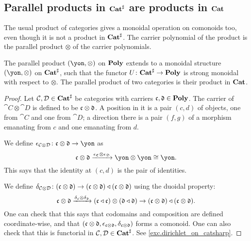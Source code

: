 \documentclass[Book-Poly]{subfiles}
\begin{document}
\subsection{Parallel products in $\mathbf{Cat}^\sharp$ are products in $\mathbf{Cat}$}

The usual product of categories gives a monoidal operation on comonoids too, even though it is not a product in $\mathbf{Cat}^\sharp$. The carrier polynomial of the product is the parallel product $\otimes$ of the carrier polynomials.


\begin{proposition}\label{prop.dirichlet_on_catsharp}
The parallel product $(\yon,\otimes)$ on $\mathbf{Poly}$ extends to a monoidal structure $(\yon,\otimes)$ on $\mathbf{Cat}^\sharp$, such that the functor
$U\colon\mathbf{Cat}^\sharp\to\mathbf{Poly}$
is strong monoidal with respect to $\otimes$.
The parallel product of two categories is their product in $\mathbf{Cat}$.
\end{proposition}
\begin{proof}
Let $\mathcal{C},\mathcal{D}\in\mathbf{Cat}^\sharp$ be categories with carriers $\mathfrak{c},\mathfrak{d}\in\mathbf{Poly}$. The carrier of $\cat{C}\otimes\cat{D}$ is defined to be $\mathfrak{c}\otimes\mathfrak{d}$. A position in it is a pair $(c,d)$ of objects, one from $\cat{C}$ and one from $\cat{D}$; a direction there is a pair $(f,g)$ of a morphism emanating from $c$ and one emanating from $d$. 

We define $\epsilon_{\cat{C}\otimes\cat{D}}\colon\ema{c}\otimes\ema{d}\to\yon$ as
\[
\ema{c}\otimes\ema{d}\To{\epsilon_{\ema{C}}\otimes\epsilon_{\ema{D}}}\yon\otimes\yon\cong\yon.
\]
This says that the identity at $(c,d)$ is the pair of identities.

We define $\delta_{\mathcal{C}\otimes\mathcal{D}}\colon(\mathfrak{c}\otimes\mathfrak{d})\to(\mathfrak{c}\otimes\mathfrak{d})\mathbin{\triangleleft}(\mathfrak{c}\otimes\mathfrak{d})$ using the duoidal property:
\[
\mathfrak{c}\otimes\mathfrak{d}\xrightarrow{\delta_{\mathfrak{c}}\otimes\delta_{\mathfrak{d}}}(\mathfrak{c}\mathbin{\triangleleft}\mathfrak{c})\otimes(\mathfrak{d}\mathbin{\triangleleft}\mathfrak{d})\to(\mathfrak{c}\otimes\mathfrak{d})\mathbin{\triangleleft}(\mathfrak{c}\otimes\mathfrak{d}).
\]
One can check that this says that codomains and composition are defined coordinate-wise, and that $(\mathfrak{c}\otimes\mathfrak{d},\epsilon_{\mathfrak{c}\otimes\mathfrak{d}},\delta_{\mathfrak{c}\otimes\mathfrak{d}})$ forms a comonoid. One can also check that this is functorial in $\mathcal{C},\mathcal{D}\in\mathbf{Cat}^\sharp$. See \cref{exc.dirichlet_on_catsharp}.
\end{proof}
\end{document}
